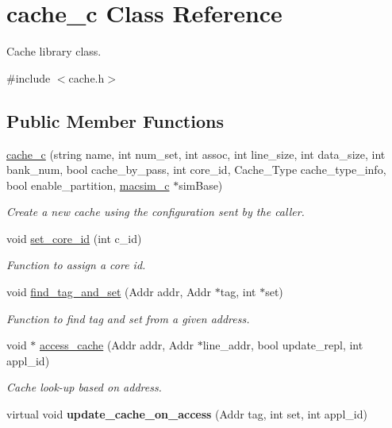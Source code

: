 \hypertarget{classcache__c}{
\section{cache\_\-c Class Reference}
\label{classcache__c}
}


Cache library class.  




{\ttfamily \#include $<$cache.h$>$}

\subsection*{Public Member Functions}
\begin{DoxyCompactItemize}
\item 
\hyperlink{classcache__c_a06c86665989bfa0caa98f72a3a3c950d}{cache\_\-c} (string name, int num\_\-set, int assoc, int line\_\-size, int data\_\-size, int bank\_\-num, bool cache\_\-by\_\-pass, int core\_\-id, Cache\_\-Type cache\_\-type\_\-info, bool enable\_\-partition, \hyperlink{classmacsim__c}{macsim\_\-c} $\ast$simBase)
\begin{DoxyCompactList}\small\item\em Create a new cache using the configuration sent by the caller. \item\end{DoxyCompactList}\item 
void \hyperlink{classcache__c_a8b93e3ac932635054aa96c3d7a5160fe}{set\_\-core\_\-id} (int c\_\-id)
\begin{DoxyCompactList}\small\item\em Function to assign a core id. \item\end{DoxyCompactList}\item 
void \hyperlink{classcache__c_aee40ee4fac5a59a7ce50f4f12d618b55}{find\_\-tag\_\-and\_\-set} (Addr addr, Addr $\ast$tag, int $\ast$set)
\begin{DoxyCompactList}\small\item\em Function to find tag and set from a given address. \item\end{DoxyCompactList}\item 
void $\ast$ \hyperlink{classcache__c_a09960f86c2e0907c90909562c17c46ef}{access\_\-cache} (Addr addr, Addr $\ast$line\_\-addr, bool update\_\-repl, int appl\_\-id)
\begin{DoxyCompactList}\small\item\em Cache look-\/up based on address. \item\end{DoxyCompactList}\item 
\hypertarget{classcache__c_a0190992dae971c5bd97684dec684e367}{
virtual void {\bfseries update\_\-cache\_\-on\_\-access} (Addr tag, int set, int appl\_\-id)}
\label{classcache__c_a0190992dae971c5bd97684dec684e367}


\end{DoxyCompactItemize}
